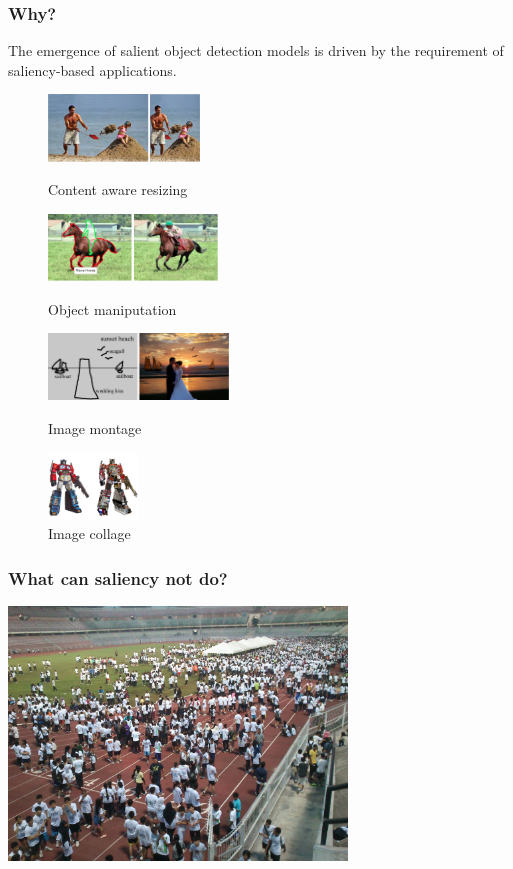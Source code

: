 \documentclass[notheorems,serif,table,compress]{beamer}  %
\begin{document}
\begin{frame}
\frametitle{Why? }
The emergence of salient object detection models is driven by the requirement of saliency-based applications.
\begin{figure}[!ht]
  \begin{minipage}[t]{0.4\textwidth}
  \includegraphics[height=0.7in]{resizing}
  \caption{Content aware resizing}
  \end{minipage}
  \begin{minipage}[t]{0.4\textwidth}
  \includegraphics[height=0.7in]{manipulation}
  \caption{Object maniputation}
  \end{minipage}

\hspace{0.28in}
  \begin{minipage}[t]{0.4\textwidth}
  \includegraphics[height=0.7in]{sketch2photo}
  \caption{Image montage}
  \end{minipage}
  \begin{minipage}[t]{0.4\textwidth}
  \hspace{0.35in}
  \includegraphics[height=0.7in]{collage.jpg}
  \caption{Image collage}
  \end{minipage}
\end{figure} 
\end{frame}


\begin{frame}
\frametitle{What can saliency not do?}
\centering\includegraphics[width=9cm]{challenge.JPG}
\end{frame}
\end{document}
